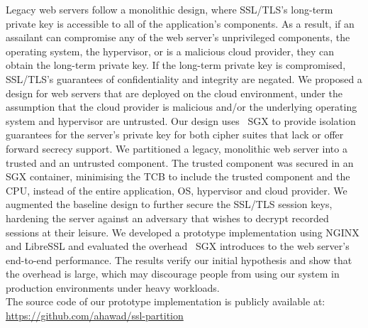 \documentclass[../main.tex]{subfiles}
\begin{document}
Legacy web servers follow a monolithic design, where SSL/TLS's
long-term private key is accessible to all of the application's
components. As a result, if an assailant can compromise any of the web
server's unprivileged components, the operating system, the
hypervisor, or is a malicious cloud provider, they can obtain the
long-term private key. If the long-term private key is compromised,
SSL/TLS's guarantees of confidentiality and integrity are negated. We
proposed a design for web servers that are deployed on the cloud
environment, under the assumption that the cloud provider is malicious
and/or the underlying operating system and hypervisor are untrusted.
Our design uses \Intel~SGX to provide isolation guarantees for the
server's private key for both cipher suites that lack or offer forward
secrecy support. We partitioned a legacy, monolithic web server into a
trusted and an untrusted component. The trusted component was secured
in an SGX container, minimising the TCB to include the trusted
component and the CPU, instead of the entire application, OS,
hypervisor and cloud provider. We augmented the baseline design to
further secure the SSL/TLS session keys, hardening the server against
an adversary that wishes to decrypt recorded sessions at their
leisure. We developed a prototype implementation using NGINX and
LibreSSL and evaluated the overhead \Intel~SGX introduces to the web
server's end-to-end performance. The results verify our initial
hypothesis and show that the overhead is large, which may discourage
people from using our system in production environments under heavy
workloads.\\

\noindent
The source code of our prototype implementation is publicly available at:\\
\url{https://github.com/ahawad/ssl-partition}
\end{document}
